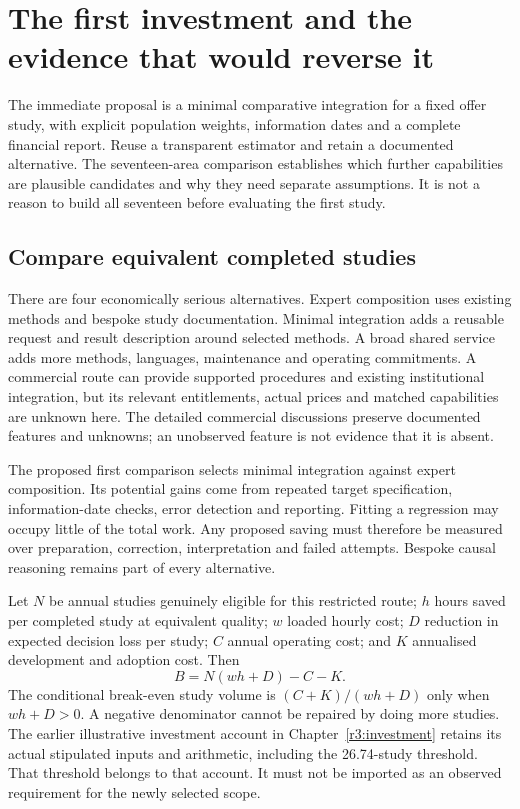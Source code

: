 \chapter{The first investment and the evidence that would reverse it}
\label{rewrite:investment-decision}

The immediate proposal is a minimal comparative integration for a fixed
offer study, with explicit population weights, information dates and
a complete financial report. Reuse a transparent estimator and retain
a documented alternative. The seventeen-area comparison establishes
which further capabilities are plausible candidates and why they need
separate assumptions. It is not a reason to build all seventeen before
evaluating the first study.

\section{Compare equivalent completed studies}
There are four economically serious alternatives. Expert composition
uses existing methods and bespoke study documentation. Minimal integration
adds a reusable request and result description around selected methods.
A broad shared service adds more methods, languages, maintenance and
operating commitments. A commercial route can provide supported
procedures and existing institutional integration, but its relevant
entitlements, actual prices and matched capabilities are unknown here.
The detailed commercial discussions preserve documented features and
unknowns; an unobserved feature is not evidence that it is absent.

The proposed first comparison selects minimal integration against expert
composition. Its potential gains come from repeated target specification,
information-date checks, error detection and reporting. Fitting a regression
may occupy little of the total work. Any proposed saving must therefore
be measured over preparation, correction, interpretation and failed
attempts. Bespoke causal reasoning remains part of every alternative.

Let $N$ be annual studies genuinely eligible for this restricted route;
$h$ hours saved per completed study at equivalent quality; $w$ loaded
hourly cost; $D$ reduction in expected decision loss per study; $C$ annual
operating cost; and $K$ annualised development and adoption cost. Then
\[
 B=N(wh+D)-C-K.
\]
The conditional break-even study volume is $(C+K)/(wh+D)$ only when
$wh+D>0$. A negative denominator cannot be repaired by doing more studies.
The earlier illustrative investment account in Chapter~\ref{r3:investment}
retains its actual stipulated inputs and arithmetic, including the
26.74-study threshold. That threshold belongs to that account. It must
not be imported as an observed requirement for the newly selected scope.

